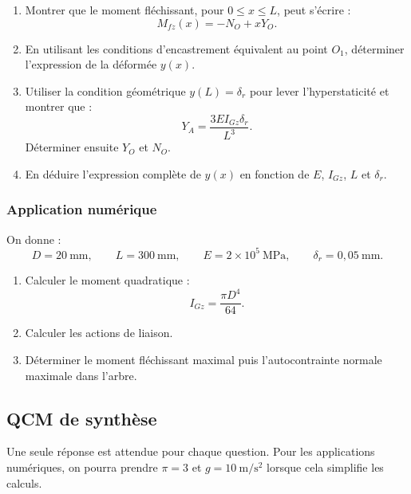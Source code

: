 \begin{enumerate}[resume]
  \item Montrer que le moment fléchissant, pour $0\leq x\leq L$, peut s'écrire :
  \[
  M_{fz}(x)=-N_O+xY_O.
  \]
  \item En utilisant les conditions d'encastrement équivalent au point $O_1$, déterminer l'expression de la déformée $y(x)$.
  \item Utiliser la condition géométrique $y(L)=\delta_r$ pour lever l'hyperstaticité et montrer que :
  \[
  \boxed{Y_A=\frac{3EI_{Gz}\delta_r}{L^3}.}
  \]
  Déterminer ensuite $Y_O$ et $N_O$.
  \item En déduire l'expression complète de $y(x)$ en fonction de $E$, $I_{Gz}$, $L$ et $\delta_r$.
\end{enumerate}

\subsubsection{Application numérique}

On donne :
\[
D=20\ \mathrm{mm},\qquad L=300\ \mathrm{mm},\qquad
E=2\times10^5\ \mathrm{MPa},\qquad \delta_r=0{,}05\ \mathrm{mm}.
\]

\begin{enumerate}[resume]
  \item Calculer le moment quadratique :
  \[
  I_{Gz}=\frac{\pi D^4}{64}.
  \]
  \item Calculer les actions de liaison.
  \item Déterminer le moment fléchissant maximal puis l'autocontrainte normale maximale dans l'arbre.
\end{enumerate}

\subsection{QCM de synthèse}

Une seule réponse est attendue pour chaque question. Pour les applications numériques, on pourra prendre $\pi=3$ et $g=10\ \mathrm{m/s^2}$ lorsque cela simplifie les calculs.

